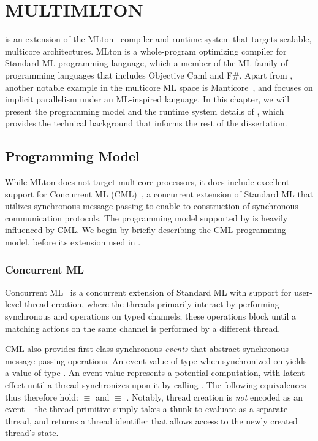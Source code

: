 \chapter{MULTIMLTON}
\label{chap:mm}

\MM is an extension of the MLton~\cite{MLton} compiler and runtime system that
targets scalable, multicore architectures. MLton is a whole-program optimizing
compiler for Standard ML programming language, which a member of the ML family
of programming languages that includes Objective Caml and F\#. Apart from \MM,
another notable example in the multicore ML space is
Manticore~\cite{Fluet2007}, and focuses on implicit parallelism under an
ML-inspired language. In this chapter, we will present the programming model
and the runtime system details of \MM, which provides the technical background
that informs the rest of the dissertation.

\section{Programming Model}

While MLton does not target multicore processors, it does include excellent
support for Concurrent ML (CML)~\cite{Reppy99}, a concurrent extension of
Standard ML that utilizes synchronous message passing to enable to construction
of synchronous communication protocols. The programming model supported by \MM
is heavily influenced by CML. We begin by briefly describing the CML
programming model, before its extension used in \MM.

\subsection{Concurrent ML}

Concurrent ML~\cite{Reppy99} is a concurrent extension of Standard ML with
support for user-level thread creation, where the threads primarily interact by
performing synchronous  and  operations on typed channels;
these operations block until a matching actions on the same channel is
performed by a different thread.

CML also provides first-class synchronous {\em events} that abstract
synchronous message-passing operations.  An event value of type 
when synchronized on yields a value of type .  An event value represents
a potential computation, with latent effect until a thread synchronizes upon it
by calling . The following equivalences thus therefore hold:
 $\equiv$  and  $\equiv$
. Notably, thread creation is {\em not} encoded as an
event -- the thread  primitive simply takes a thunk to evaluate as a
separate thread, and returns a thread identifier that allows access to the
newly created thread's state.

